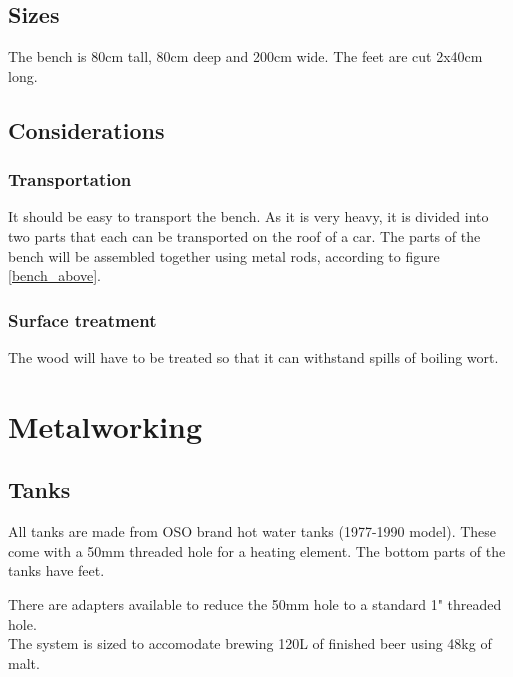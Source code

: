 \documentclass[11pt,fleqn,openany]{book} %
\begin{document}
\section{Sizes}

The bench is 80cm tall, 80cm deep and 200cm wide. The feet are cut 2x40cm long.

\section{Considerations}

\subsection{Transportation}

It should be easy to transport the bench. As it is very heavy, it is divided into two parts that each can be transported on the roof of a car. The parts of the bench will be assembled together using metal rods, according to figure \ref{bench_above}.

\subsection{Surface treatment}

The wood will have to be treated so that it can withstand spills of boiling wort.



\chapter{Metalworking}

\section{Tanks}

All tanks are made from OSO brand hot water tanks (1977-1990 model). These come with a 50mm threaded hole for a heating element. The bottom parts of the tanks have feet.

There are adapters available to reduce the 50mm hole to a standard 1" threaded hole.\\

The system is sized to accomodate brewing 120L of finished beer using 48kg of malt.
\end{document}
